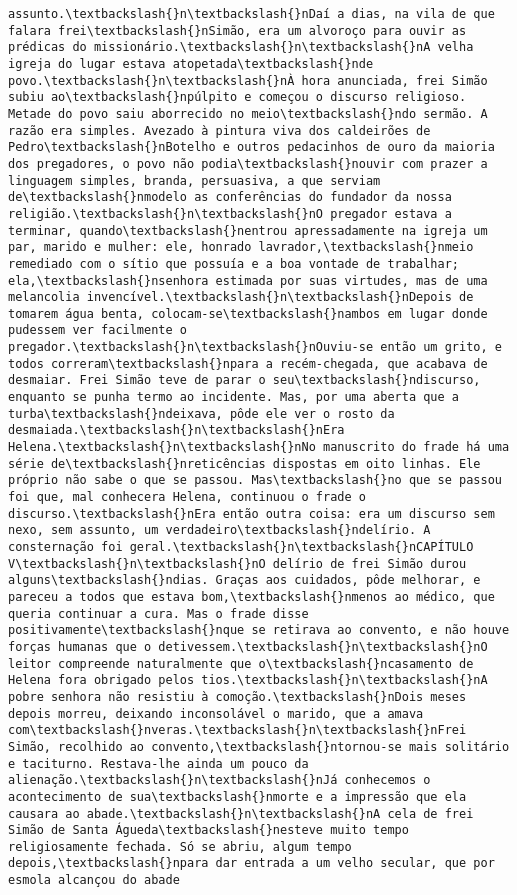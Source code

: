 \begin{Verbatim}[commandchars=\\\{\}]
assunto.\textbackslash{}n\textbackslash{}nDaí a dias, na vila de que falara frei\textbackslash{}nSimão, era um alvoroço para ouvir as prédicas do missionário.\textbackslash{}n\textbackslash{}nA velha igreja do lugar estava atopetada\textbackslash{}nde povo.\textbackslash{}n\textbackslash{}nÀ hora anunciada, frei Simão subiu ao\textbackslash{}npúlpito e começou o discurso religioso. Metade do povo saiu aborrecido no meio\textbackslash{}ndo sermão. A razão era simples. Avezado à pintura viva dos caldeirões de Pedro\textbackslash{}nBotelho e outros pedacinhos de ouro da maioria dos pregadores, o povo não podia\textbackslash{}nouvir com prazer a linguagem simples, branda, persuasiva, a que serviam de\textbackslash{}nmodelo as conferências do fundador da nossa religião.\textbackslash{}n\textbackslash{}nO pregador estava a terminar, quando\textbackslash{}nentrou apressadamente na igreja um par, marido e mulher: ele, honrado lavrador,\textbackslash{}nmeio remediado com o sítio que possuía e a boa vontade de trabalhar; ela,\textbackslash{}nsenhora estimada por suas virtudes, mas de uma melancolia invencível.\textbackslash{}n\textbackslash{}nDepois de tomarem água benta, colocam-se\textbackslash{}nambos em lugar donde pudessem ver facilmente o pregador.\textbackslash{}n\textbackslash{}nOuviu-se então um grito, e todos correram\textbackslash{}npara a recém-chegada, que acabava de desmaiar. Frei Simão teve de parar o seu\textbackslash{}ndiscurso, enquanto se punha termo ao incidente. Mas, por uma aberta que a turba\textbackslash{}ndeixava, pôde ele ver o rosto da desmaiada.\textbackslash{}n\textbackslash{}nEra Helena.\textbackslash{}n\textbackslash{}nNo manuscrito do frade há uma série de\textbackslash{}nreticências dispostas em oito linhas. Ele próprio não sabe o que se passou. Mas\textbackslash{}no que se passou foi que, mal conhecera Helena, continuou o frade o discurso.\textbackslash{}nEra então outra coisa: era um discurso sem nexo, sem assunto, um verdadeiro\textbackslash{}ndelírio. A consternação foi geral.\textbackslash{}n\textbackslash{}nCAPÍTULO V\textbackslash{}n\textbackslash{}nO delírio de frei Simão durou alguns\textbackslash{}ndias. Graças aos cuidados, pôde melhorar, e pareceu a todos que estava bom,\textbackslash{}nmenos ao médico, que queria continuar a cura. Mas o frade disse positivamente\textbackslash{}nque se retirava ao convento, e não houve forças humanas que o detivessem.\textbackslash{}n\textbackslash{}nO leitor compreende naturalmente que o\textbackslash{}ncasamento de Helena fora obrigado pelos tios.\textbackslash{}n\textbackslash{}nA pobre senhora não resistiu à comoção.\textbackslash{}nDois meses depois morreu, deixando inconsolável o marido, que a amava com\textbackslash{}nveras.\textbackslash{}n\textbackslash{}nFrei Simão, recolhido ao convento,\textbackslash{}ntornou-se mais solitário e taciturno. Restava-lhe ainda um pouco da alienação.\textbackslash{}n\textbackslash{}nJá conhecemos o acontecimento de sua\textbackslash{}nmorte e a impressão que ela causara ao abade.\textbackslash{}n\textbackslash{}nA cela de frei Simão de Santa Águeda\textbackslash{}nesteve muito tempo religiosamente fechada. Só se abriu, algum tempo depois,\textbackslash{}npara dar entrada a um velho secular, que por esmola alcançou do abade 
\end{Verbatim}
